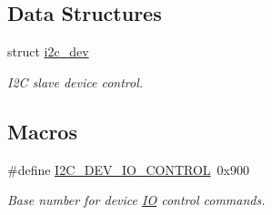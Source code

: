 \subsection*{Data Structures}
\begin{DoxyCompactItemize}
\item 
struct \mbox{\hyperlink{structi2c__dev}{i2c\+\_\+dev}}
\begin{DoxyCompactList}\small\item\em I2C slave device control. \end{DoxyCompactList}\end{DoxyCompactItemize}
\subsection*{Macros}
\begin{DoxyCompactItemize}
\item 
\mbox{\label{group__I2CDevice_gae8b74d1b5fc16a9c31e4da115b0ab004}} 
\#define \mbox{\hyperlink{group__I2CDevice_gae8b74d1b5fc16a9c31e4da115b0ab004}{I2\+C\+\_\+\+D\+E\+V\+\_\+\+I\+O\+\_\+\+C\+O\+N\+T\+R\+OL}}~0x900
\begin{DoxyCompactList}\small\item\em Base number for device \mbox{\hyperlink{structIO}{IO}} control commands. \end{DoxyCompactList}\end{DoxyCompactItemize}
